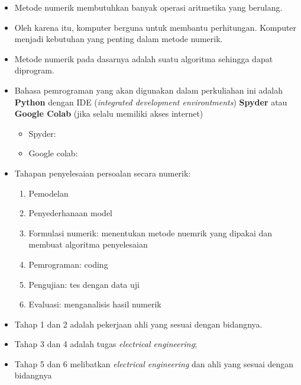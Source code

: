\documentclass[pdflatex,compress]{beamer}
\begin{document}
\begin{frame}
	\begin{itemize}
		\item Metode numerik membutuhkan banyak operasi aritmetika yang berulang.
		\item Oleh karena itu, komputer berguna untuk membantu perhitungan. Komputer menjadi kebutuhan yang penting dalam metode numerik.
		\item Metode numerik pada dasarnya adalah suatu algoritma sehingga dapat diprogram.
		\item Bahasa pemrograman yang akan digunakan dalam perkuliahan ini adalah \textbf{Python} dengan IDE (\textit{integrated development environtments}) \textbf{Spyder} atau \textbf{Google Colab} (jika selalu memiliki akses internet)
		\begin{itemize}
			\item Spyder: \href{https://github.com/spyder-ide/spyder/releases/latest/download/Spyder_64bit_full.exe}{}
			\item Google colab: \href{https://colab.research.google.com/}{}
		\end{itemize}
	\end{itemize}
\end{frame}

\begin{frame}
	\begin{itemize}
		\item Tahapan penyelesaian persoalan secara numerik:
		\begin{enumerate}
			\item Pemodelan
			\item Penyederhanaan model
			\item Formulasi numerik: menentukan metode nuemrik yang dipakai dan membuat algoritma penyelesaian
			\item Pemrograman: coding
			\item Pengujian: tes dengan data uji
			\item Evaluasi: menganalisis hasil numerik
		\end{enumerate}
		\item Tahap 1 dan 2 adalah pekerjaan ahli yang sesuai dengan bidangnya.
		\item Tahap 3 dan 4 adalah tugas \textit{electrical engineering};
		\item Tahap 5 dan 6 melibatkan \textit{electrical engineering} dan ahli yang sesuai dengan bidangnya
		
	\end{itemize}
\end{frame}
\end{document}
